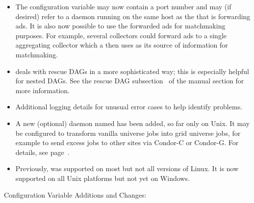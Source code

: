 \begin{itemize}
\item The configuration variable  may now
  contain a port number and may (if desired) refer to a
   daemon running on the same host as the
   that is forwarding ads.  It is also now possible to
  use the forwarded ads for matchmaking purposes.  For example, several
  collectors could forward ads to a single aggregating collector which
  a  then uses as its source of information for
  matchmaking.

\item {} deals with rescue DAGs in a more sophisticated
way; this is especially helpful for nested DAGs.
See the rescue DAG subsection~\pageref{sec:DAGRescue} of the 
manual section for more information.

\item Additional logging details for unusual error cases to help 
identify problems.

\item A new (optional) daemon named  has been
added, so far only on Unix.  It may be configured to transform vanilla
universe jobs into grid universe jobs, for example to send excess jobs
to other sites via Condor-C or Condor-G.  For details, see
page~\pageref{sec:JobRouter}.

\item Previously,   was supported on most
but not all versions of Linux.  It is now supported on all Unix platforms
but not yet on Windows.

\end{itemize}

\noindent Configuration Variable Additions and Changes:

